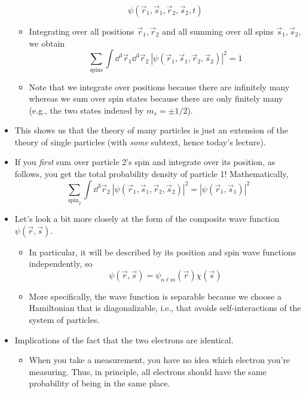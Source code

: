 \documentclass[../notes.tex]{subfiles}
\begin{document}
\begin{itemize}
\begin{itemize}
\begin{equation*}
            \psi(\vec{r}_1,\vec{s}_1,\vec{r}_2,\vec{s}_2,t)
        \end{equation*}
        \item Integrating over all positions $\vec{r}_1,\vec{r}_2$ and all summing over all spins $\vec{s}_1,\vec{s}_2$, we obtain
        \begin{equation*}
            \sum_\text{spins}\int\dd^3\vec{r}_1\dd^3\vec{r}_2\ |\psi(\vec{r}_1,\vec{s}_1,\vec{r}_2,\vec{s}_2)|^2 = 1
        \end{equation*}
        \item Note that we integrate over positions because there are infinitely many whereas we sum over spin states because there are only finitely many (e.g., the two states indexed by $m_s=\pm 1/2$).
    \end{itemize}
    \item This shows us that the theory of many particles is just an extension of the theory of single particles (with \emph{some} subtext, hence today's lecture).
    \item If you \emph{first} sum over particle 2's spin and integrate over its position, as follows, you get the total probability density of particle 1! Mathematically,
    \begin{equation*}
        \sum_{\text{spin}_2}\int\dd^3\vec{r}_2\ |\psi(\vec{r}_1,\vec{s}_1,\vec{r}_2,\vec{s}_2)|^2 = |\psi(\vec{r}_1,\vec{s}_1)|^2
    \end{equation*}
    \item Let's look a bit more closely at the form of the composite wave function $\psi(\vec{r},\vec{s})$.
    \begin{itemize}
        \item In particular, it will be described by its position and spin wave functions independently, so
        \begin{equation*}
            \psi(\vec{r},\vec{s}) = \psi_{n\ell m}(\vec{r})\chi(\vec{s})
        \end{equation*}
        \item More specifically, the wave function is separable because we choose a Hamiltonian that is diagonalizable, i.e., that avoids self-interactions of the system of particles.
    \end{itemize}
    \item Implications of the fact that the two electrons are identical.
    \begin{itemize}
        \item When you take a measurement, you have no idea which electron you're measuring. Thus, in principle, all electrons should have the same probability of being in the same place.

\end{itemize}
\end{itemize}
\end{document}
